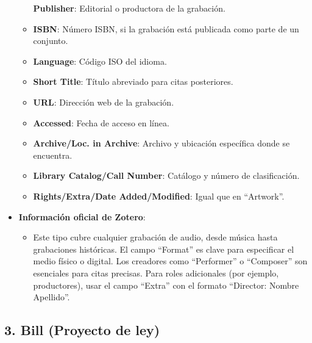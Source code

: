 \documentclass[
  jou,
  floatsintext,
  longtable,
  a4paper,
  nolmodern,
  notxfonts,
  notimes,
  colorlinks=true,linkcolor=blue,citecolor=blue,urlcolor=blue]{apa7}
\providecommand{\tightlist}{%
  \setlength{\itemsep}{0pt}\setlength{\parskip}{0pt}}
\begin{document}
\begin{itemize}
\begin{itemize}
    \textbf{Publisher}: Editorial o productora de la grabación.
  \item
    \textbf{ISBN}: Número ISBN, si la grabación está publicada como
    parte de un conjunto.
  \item
    \textbf{Language}: Código ISO del idioma.
  \item
    \textbf{Short Title}: Título abreviado para citas posteriores.
  \item
    \textbf{URL}: Dirección web de la grabación.
  \item
    \textbf{Accessed}: Fecha de acceso en línea.
  \item
    \textbf{Archive/Loc. in Archive}: Archivo y ubicación específica
    donde se encuentra.
  \item
    \textbf{Library Catalog/Call Number}: Catálogo y número de
    clasificación.
  \item
    \textbf{Rights/Extra/Date Added/Modified}: Igual que en ``Artwork''.
  \end{itemize}
\item
  \textbf{Información oficial de Zotero}:

  \begin{itemize}
  \tightlist
  \item
    Este tipo cubre cualquier grabación de audio, desde música hasta
    grabaciones históricas. El campo ``Format'' es clave para
    especificar el medio físico o digital. Los creadores como
    ``Performer'' o ``Composer'' son esenciales para citas precisas.
    Para roles adicionales (por ejemplo, productores), usar el campo
    ``Extra'' con el formato ``Director: Nombre \textbar\textbar{}
    Apellido''.
  \end{itemize}
\end{itemize}

\subsection{3. Bill (Proyecto de ley)}\label{bill-proyecto-de-ley}
\end{document}
